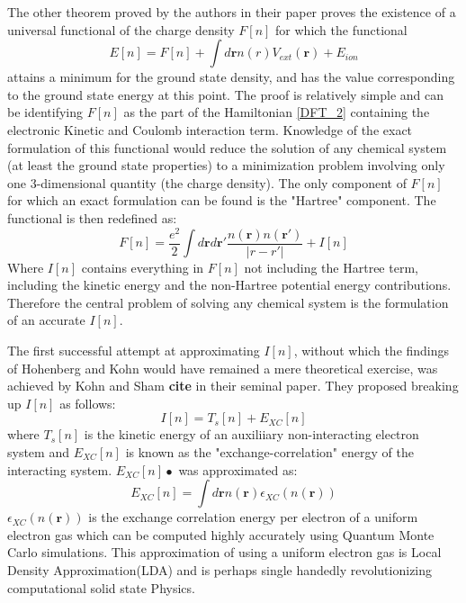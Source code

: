\documentclass[12pt,a4paper]{article}
\newcommand{\rmb}{\mathbf{r}}
\newcommand{\dens}{n(\rmb)}
\begin{document}
The other theorem proved by the authors in their paper proves the existence of   a universal functional of the charge density $F[n]$ for which the functional
\begin{equation}
E[n]=F[n] +\int d \rmb n(r) V_{ext}(\rmb) + E_{ion} 
\end{equation}
attains a minimum for the ground state density, and has the value corresponding to the ground state energy at this point. The proof is relatively simple and can be identifying $F[n]$ as the part of the Hamiltonian \ref{DFT_2} containing the electronic Kinetic and Coulomb interaction term. Knowledge of the exact formulation of this functional would reduce the solution of any chemical system (at least the ground state properties) to a minimization problem involving only one 3-dimensional quantity (the charge density). The only component of $F[n]$ for which an exact formulation can be found is the "Hartree" component. The functional is then redefined as:
\begin{equation}
 F[n]= \dfrac{e^2}{2}\int d\rmb d\rmb' \dfrac{n(\rmb) n(\rmb')}{|r-r'|} + I[n]
 \end{equation} 
Where $I[n]$ contains everything in $F[n]$ not including the Hartree term, including the kinetic energy and the non-Hartree potential energy contributions. Therefore the central problem of solving any chemical system is the formulation of an accurate $I[n]$.

The first successful attempt at approximating $I[n]$, without which the findings of Hohenberg and Kohn would have remained a mere theoretical exercise, was achieved by Kohn and Sham \textbf{cite} in their seminal paper. They proposed breaking up $I[n]$ as follows:
\begin{equation}
 I[n]=T_s[n]+E_{XC}[n]
 \end{equation} 
where $T_s[n]$ is the kinetic energy of an auxiliiary non-interacting electron system and $E_{XC}[n]$ is known as the "exchange-correlation" energy of the interacting system. $E_{XC}[n]•$ was approximated as:
\begin{equation}
E_{XC}[n]=\int d\rmb \dens \epsilon_{XC}(\dens)
\end{equation}
$\epsilon_{XC}(\dens)$ is the exchange correlation energy per electron of a uniform electron gas which can be computed highly accurately using Quantum Monte Carlo simulations. This approximation of using a uniform electron gas is Local Density Approximation(LDA) and is perhaps single handedly revolutionizing computational solid state Physics. 




	 
 


 
\end{document}
